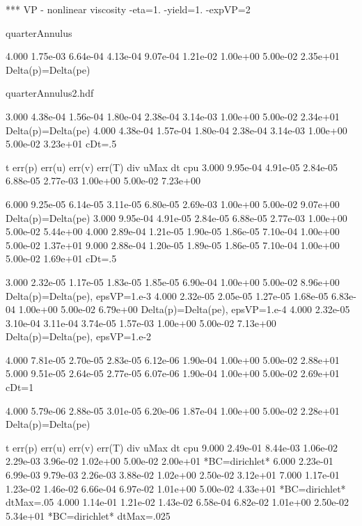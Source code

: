 {*** VP - nonlinear viscosity -eta=1. -yield=1. -expVP=2


quarterAnnulus

   4.000 1.75e-03 6.64e-04 4.13e-04 9.07e-04 1.21e-02  1.00e+00 5.00e-02 2.35e+01  Delta(p)=Delta(pe)

quarterAnnulus2.hdf

   3.000 4.38e-04 1.56e-04 1.80e-04 2.38e-04 3.14e-03  1.00e+00 5.00e-02 2.34e+01  Delta(p)=Delta(pe)
   4.000 4.38e-04 1.57e-04 1.80e-04 2.38e-04 3.14e-03  1.00e+00 5.00e-02 3.23e+01  cDt=.5


     t    err(p)   err(u)   err(v)   err(T)    div       uMax     dt       cpu
   3.000 9.95e-04 4.91e-05 2.84e-05 6.88e-05 2.77e-03  1.00e+00 5.00e-02 7.23e+00

   6.000 9.25e-05 6.14e-05 3.11e-05 6.80e-05 2.69e-03  1.00e+00 5.00e-02 9.07e+00 Delta(p)=Delta(pe)
   3.000 9.95e-04 4.91e-05 2.84e-05 6.88e-05 2.77e-03  1.00e+00 5.00e-02 5.44e+00
   4.000 2.89e-04 1.21e-05 1.90e-05 1.86e-05 7.10e-04  1.00e+00 5.00e-02 1.37e+01
   9.000 2.88e-04 1.20e-05 1.89e-05 1.86e-05 7.10e-04  1.00e+00 5.00e-02 1.69e+01 cDt=.5 

   3.000 2.32e-05 1.17e-05 1.83e-05 1.85e-05 6.90e-04  1.00e+00 5.00e-02 8.96e+00   Delta(p)=Delta(pe), epsVP=1.e-3
   4.000 2.32e-05 2.05e-05 1.27e-05 1.68e-05 6.83e-04  1.00e+00 5.00e-02 6.79e+00   Delta(p)=Delta(pe), epsVP=1.e-4
   4.000 2.32e-05 3.10e-04 3.11e-04 3.74e-05 1.57e-03  1.00e+00 5.00e-02 7.13e+00   Delta(p)=Delta(pe), epsVP=1.e-2


   4.000 7.81e-05 2.70e-05 2.83e-05 6.12e-06 1.90e-04  1.00e+00 5.00e-02 2.88e+01
   5.000 9.51e-05 2.64e-05 2.77e-05 6.07e-06 1.90e-04  1.00e+00 5.00e-02 2.69e+01 cDt=1

   4.000 5.79e-06 2.88e-05 3.01e-05 6.20e-06 1.87e-04  1.00e+00 5.00e-02 2.28e+01  Delta(p)=Delta(pe)

     t    err(p)   err(u)   err(v)   err(T)    div       uMax     dt       cpu
   9.000 2.49e-01 8.44e-03 1.06e-02 2.29e-03 3.96e-02  1.02e+00 5.00e-02 2.00e+01  *BC=dirichlet*
   6.000 2.23e-01 6.99e-03 9.79e-03 2.26e-03 3.88e-02  1.02e+00 2.50e-02 3.12e+01
   7.000 1.17e-01 1.23e-02 1.46e-02 6.66e-04 6.97e-02  1.01e+00 5.00e-02 4.33e+01  *BC=dirichlet* dtMax=.05
   4.000 1.14e-01 1.21e-02 1.43e-02 6.58e-04 6.82e-02  1.01e+00 2.50e-02 5.34e+01  *BC=dirichlet* dtMax=.025

}

